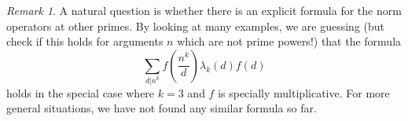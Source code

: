 \documentclass[a4paper]{article}
\theoremstyle{definition}
\theoremstyle{remark}
\newtheorem*{remark}{Remark}
\begin{document}
\begin{remark}
A natural question is whether there is an explicit formula for the norm operators at other primes. By looking at many examples, we are guessing (but check if this holds for arguments $n$ which are not prime powers!) that the formula 
$$ \sum_{d \vert n^k} f(\frac{n^k}{d}) \lambda_k(d) f(d)  $$
holds in the special case where $k=3$ and $f$ is specially multiplicative. For more general situations, we have not found any similar formula so far. 
\end{remark}



\newpage
\appendix






\end{document}
